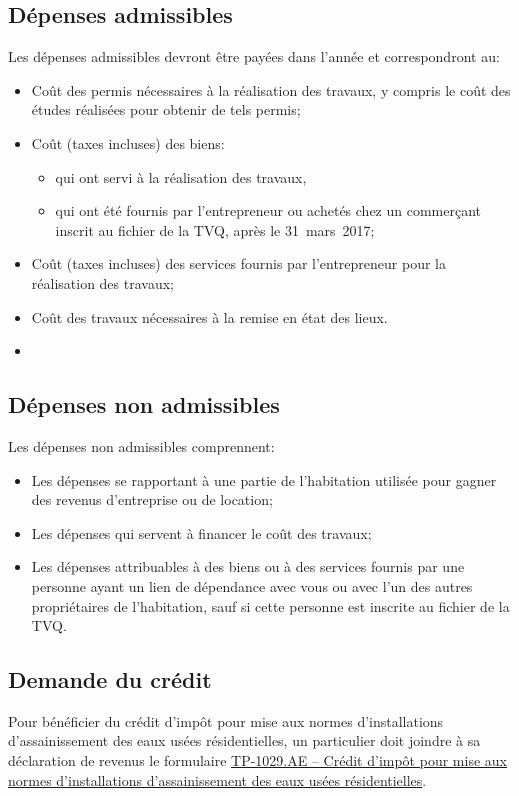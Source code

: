 \subsection{Dépenses admissibles}
Les dépenses admissibles devront être payées dans l'année et correspondront au:
\begin{itemize}[label=]
	\item Coût des permis nécessaires à la réalisation des travaux, y compris le coût des études réalisées pour obtenir de tels permis;
	\item Coût (taxes incluses) des biens:
	\begin{itemize}
		\item qui ont servi à la réalisation des travaux,
		\item qui ont été fournis par l'entrepreneur ou achetés chez un commerçant inscrit au fichier de la TVQ, après le 31~mars~2017;
	\end{itemize}
	\item Coût (taxes incluses) des services fournis par l'entrepreneur pour la réalisation des travaux;
	\item Coût des travaux nécessaires à la remise en état des lieux.
	\item 
\end{itemize}


\subsection{Dépenses non admissibles}
Les dépenses non admissibles comprennent:
\begin{itemize}[label=]
	\item Les dépenses se rapportant à une partie de l'habitation utilisée pour gagner des revenus d'entreprise ou de location;
	\item Les dépenses qui servent à financer le coût des travaux;
	\item Les dépenses attribuables à des biens ou à des services fournis par une personne ayant un lien de dépendance avec vous ou avec l'un des autres propriétaires de l'habitation, sauf si cette personne est inscrite au fichier de la TVQ.
\end{itemize}


\subsection{Demande du crédit}
Pour bénéficier du crédit d'impôt pour mise aux normes d'installations d'assainissement des eaux usées résidentielles, un particulier doit joindre à sa déclaration de revenus le formulaire \href{https://www.revenuquebec.ca/documents/fr/formulaires/tp/TP-1029.AE(2022-10).pdf}{TP-1029.AE -- Crédit d'impôt pour mise aux normes d'installations d'assainissement des eaux usées résidentielles}.

